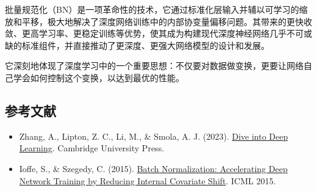 批量规范化（BN）是一项革命性的技术，它通过标准化层输入并辅以可学习的缩放和平移，极大地解决了深度网络训练中的内部协变量偏移问题。其带来的更快收敛、更高学习率、更稳定训练等优势，使其成为构建现代深度神经网络几乎不可或缺的标准组件，并直接推动了更深度、更强大网络模型的设计和发展。

它深刻地体现了深度学习中的一个重要思想：不仅要对数据做变换，更要让网络自己学会如何控制这个变换，以达到最优的性能。

\FloatBarrier
{}
\hypertarget{ux53c2ux8003ux6587ux732e-8}{%
\subsection{参考文献}\label{ux53c2ux8003ux6587ux732e-8}}

\vspace{0.25em}
\begin{itemize}
\tightlist
\item
  Zhang, A., Lipton, Z. C., Li, M., \& Smola, A. J. (2023). \href{https://D2L.ai}{Dive into Deep Learning}. Cambridge University Press.
\item
  Ioffe, S., \& Szegedy, C. (2015). \href{https://arxiv.org/abs/1502.03167}{Batch Normalization: Accelerating Deep Network Training by Reducing Internal Covariate Shift}. ICML 2015.
\end{itemize}

\clearpage
